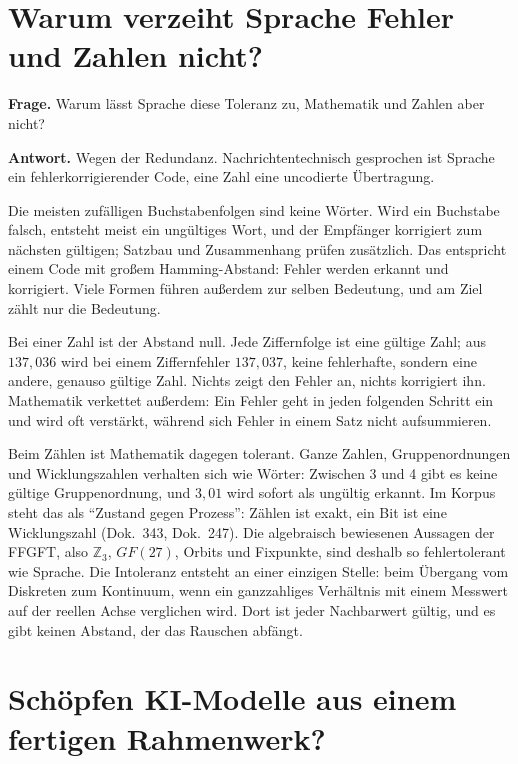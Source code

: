 \section{Warum verzeiht Sprache Fehler und Zahlen nicht?}

\textbf{Frage.} Warum lässt Sprache diese Toleranz zu, Mathematik und Zahlen aber nicht?

\textbf{Antwort.} Wegen der Redundanz. Nachrichtentechnisch gesprochen ist Sprache ein
fehlerkorrigierender Code, eine Zahl eine uncodierte Übertragung.

Die meisten zufälligen Buchstabenfolgen sind keine Wörter. Wird ein Buchstabe falsch, entsteht meist
ein ungültiges Wort, und der Empfänger korrigiert zum nächsten gültigen; Satzbau und Zusammenhang
prüfen zusätzlich. Das entspricht einem Code mit großem Hamming-Abstand: Fehler werden erkannt und
korrigiert. Viele Formen führen außerdem zur selben Bedeutung, und am Ziel zählt nur die Bedeutung.

Bei einer Zahl ist der Abstand null. Jede Ziffernfolge ist eine gültige Zahl; aus $137{,}036$ wird
bei einem Ziffernfehler $137{,}037$, keine fehlerhafte, sondern eine andere, genauso gültige Zahl.
Nichts zeigt den Fehler an, nichts korrigiert ihn. Mathematik verkettet außerdem: Ein Fehler geht in
jeden folgenden Schritt ein und wird oft verstärkt, während sich Fehler in einem Satz nicht
aufsummieren.

Beim Zählen ist Mathematik dagegen tolerant. Ganze Zahlen, Gruppenordnungen und Wicklungszahlen
verhalten sich wie Wörter: Zwischen 3 und 4 gibt es keine gültige Gruppenordnung, und $3{,}01$ wird
sofort als ungültig erkannt. Im Korpus steht das als \enquote{Zustand gegen Prozess}: Zählen ist
exakt, ein Bit ist eine Wicklungszahl (Dok.~343, Dok.~247). Die algebraisch bewiesenen Aussagen der
FFGFT, also $\mathbb Z_3$, $GF(27)$, Orbits und Fixpunkte, sind deshalb so fehlertolerant wie
Sprache. Die Intoleranz entsteht an einer einzigen Stelle: beim Übergang vom Diskreten zum
Kontinuum, wenn ein ganzzahliges Verhältnis mit einem Messwert auf der reellen Achse verglichen wird.
Dort ist jeder Nachbarwert gültig, und es gibt keinen Abstand, der das Rauschen abfängt.

\section{Schöpfen KI-Modelle aus einem fertigen Rahmenwerk?}

